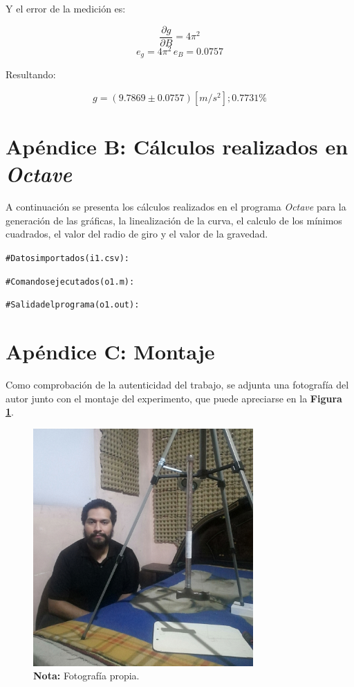 \documentclass[letter,11pt]{article}
\newcommand{\source}[1]{\vspace{-11pt} \caption*{\small{\textbf{Nota:} {#1}}}}
\begin{document}
Y el error de la medición es:

\begin{equation*}
    \frac{\partial g}{\partial B} = 4 \pi^2
\end{equation*}
\begin{equation*}
    e_g = 4 \pi^2\,e_B = 0.0757
\end{equation*}
\vspace{0.10cm}

Resultando:

\begin{equation*}
    g = (9.7869 \pm 0.0757) [m/s^2]; 0.7731\%
\end{equation*}
\vspace{0.10cm}

\newpage
\section*{Apéndice B: Cálculos realizados en \emph{Octave}}

A continuación se presenta los cálculos realizados en el programa \emph{Octave}
para la generación de las gráficas, la linealización de la curva, el calculo
de los mínimos cuadrados, el valor del radio de giro y el valor de la gravedad.

\begin{shaded}
\begin{alltt}
\footnotesize
\# Datos importados (i1.csv):

\# Comandos ejecutados (o1.m):



\# Salida del programa (o1.out):

\normalsize
\end{alltt}
\end{shaded}

\newpage
\section*{Apéndice C: Montaje}

Como comprobación de la autenticidad del trabajo, se adjunta una fotografía del
autor junto con el montaje del experimento, que puede apreciarse en la
\textbf{Figura \ref{figura6}}.

\begin{figure}
\centering
\includegraphics[width=0.75\textwidth]{resources/f5.eps}
\caption{Autorretrato con el montaje del experimento.}
\label{figura6}
\source{Fotografía propia.}
\end{figure}
\end{document}
